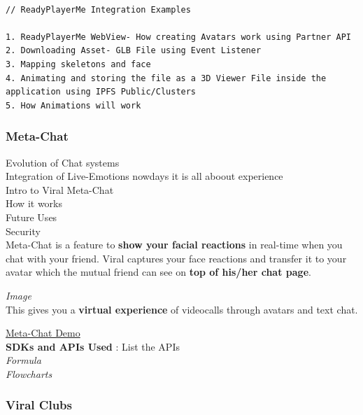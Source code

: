 \documentclass[conference]{IEEEtran}
\begin{document}
\begin{lstlisting}[language=Solidity]

// ReadyPlayerMe Integration Examples

1. ReadyPlayerMe WebView- How creating Avatars work using Partner API
2. Downloading Asset- GLB File using Event Listener
3. Mapping skeletons and face
4. Animating and storing the file as a 3D Viewer File inside the application using IPFS Public/Clusters
5. How Animations will work

\end{lstlisting}

\subsubsection{\textbf{Meta-Chat}}

Evolution of Chat systems\\

Integration of Live-Emotions nowdays it is all aboout experience\\

Intro to Viral Meta-Chat\\

How it works\\

Future Uses\\

Security\\

Meta-Chat is a feature to \textbf{show your facial reactions} in real-time when you chat with your friend. Viral captures your face reactions and transfer it to your avatar which the mutual friend can see on \textbf{top of his/her chat page}.

\textit{Image}\\

This gives you a \textbf{virtual experience} of videocalls through avatars and text chat.

\hyperlink{https://sample.com}{Meta-Chat Demo}\\

\textbf{SDKs and APIs Used} : List the APIs\\

\textit{Formula\\
Flowcharts}

\subsubsection{\textbf{Viral Clubs}}
\end{document}
